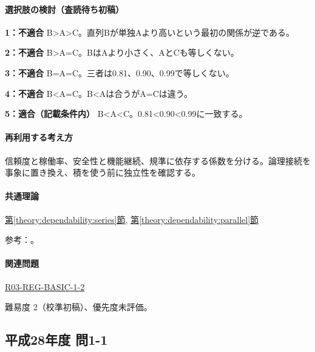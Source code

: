 \paragraph{選択肢の検討（査読待ち初稿）}\mbox{}\par

\noindent\textbf{1：不適合} B>A>C。直列Bが単独Aより高いという最初の関係が逆である。\par

\noindent\textbf{2：不適合} B>A=\allowbreak{}C。BはAより小さく、AとCも等しくない。\par

\noindent\textbf{3：不適合} B=\allowbreak{}A=\allowbreak{}C。三者は0.81、0.90、0.99で等しくない。\par

\noindent\textbf{4：不適合} B<A=\allowbreak{}C。B<Aは合うがA=\allowbreak{}Cは違う。\par

\noindent\textbf{5：適合（記載条件内）} B<A<C。0.81<0.90<0.99に一致する。\par

\paragraph{再利用する考え方} 信頼度と稼働率、安全性と機能継続、規準に依存する係数を分ける。論理接続を事象に置き換え、積を使う前に独立性を確認する。

\paragraph{共通理論} \hyperref[theory:dependability:series]{第\ref*{theory:dependability:series}節}, \hyperref[theory:dependability:parallel]{第\ref*{theory:dependability:parallel}節}

\par 参考：\cite{reliability_nist_series,reliability_nist_parallel}。

\paragraph{関連問題} \hyperref[q:r03-reg-basic-1-2]{R03-REG-BASIC-1-2}

\par 難易度 2（校準初稿）、優先度未評価。

\subsection{平成28年度 問1-1}
\label{q:h28-reg-basic-1-1}

